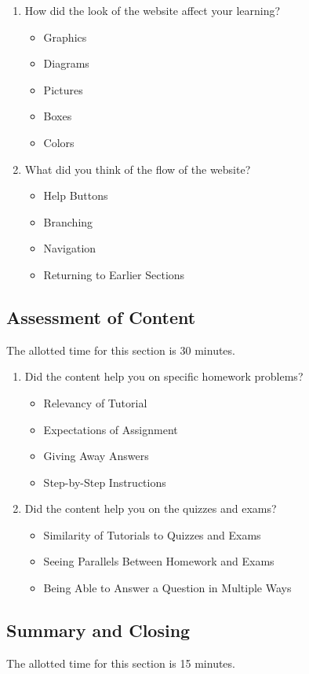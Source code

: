 \begin{enumerate}
	\item How did the look of the website affect your learning?
	\begin{itemize}
		\item Graphics
		\item Diagrams
		\item Pictures
		\item Boxes
		\item Colors
	\end{itemize}
	\item What did you think of the flow of the website?
	\begin{itemize}
		\item Help Buttons
		\item Branching
		\item Navigation
		\item Returning to Earlier Sections
	\end{itemize}
\end{enumerate}

\subsection{Assessment of Content}
The allotted time for this section is 30 minutes.

\begin{enumerate}
	\item Did the content help you on specific homework problems?
	\begin{itemize}
		\item Relevancy of Tutorial
		\item Expectations of Assignment
		\item Giving Away Answers
		\item Step-by-Step Instructions
	\end{itemize}
	\item Did the content help you on the quizzes and exams?
	\begin{itemize}
		\item Similarity of Tutorials to Quizzes and Exams
		\item Seeing Parallels Between Homework and Exams
		\item Being Able to Answer a Question in Multiple Ways
	\end{itemize}
\end{enumerate}

\subsection{Summary and Closing}
The allotted time for this section is 15 minutes.

